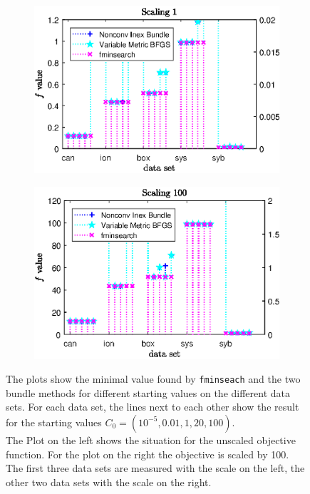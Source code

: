 \begin{figure}[ht]
	\begin{subfigure}{0.49\textwidth}
		\includegraphics[width=\textwidth]{Pictures/Plots/Scal1_ll-15f.eps}%
	\end{subfigure}
	\begin{subfigure}{0.49\textwidth}
		\includegraphics[width=\textwidth]{Pictures/Plots/Scal100_ll-15f.eps}%
	\end{subfigure}
	\caption[Minimium for different starting values and scalings]{The plots show the minimal value found by \textup{\texttt{fminseach}} and the two bundle methods for different starting values on the different data sets. For each data set, the lines next to each other show the result for the starting values \(C_0 = (10^{-5},0.01,1,20,100)\).\\
	The Plot on the left shows the situation for the unscaled objective function. For the plot on the right the objective is scaled by 100.\\
	The first three data sets are measured with the scale on the left, the other two data sets with the scale on the right.}%
	\label{fig_ll15_sc1100_f}%
\end{figure}

